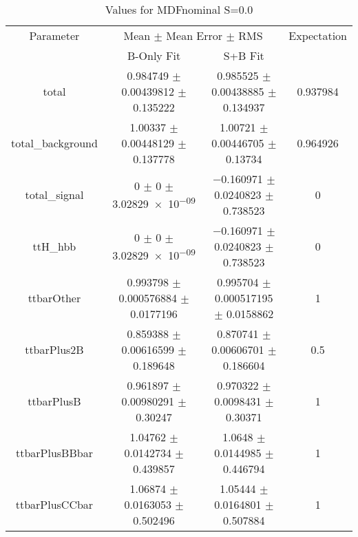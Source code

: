 \begin{table}
\centering
\caption{Values for MDFnominal S=0.0}
\begin{tabular}{cccc}
\toprule
Parameter & \multicolumn{2}{c}{Mean $\pm$ Mean Error $\pm$ RMS} & Expectation\\
 & B-Only Fit & S+B Fit & \\
\midrule
total & \num{0.984749} $\pm$ \num{0.00439812} $\pm$ \num{0.135222} & \num{0.985525} $\pm$ \num{0.00438885} $\pm$ \num{0.134937} & \num{0.937984}\\
total\_background & \num{1.00337} $\pm$ \num{0.00448129} $\pm$ \num{0.137778} & \num{1.00721} $\pm$ \num{0.00446705} $\pm$ \num{0.13734} & \num{0.964926}\\
total\_signal & \num{0} $\pm$ \num{0} $\pm$ \num{3.02829e-09} & \num{-0.160971} $\pm$ \num{0.0240823} $\pm$ \num{0.738523} & \num{0}\\
ttH\_hbb & \num{0} $\pm$ \num{0} $\pm$ \num{3.02829e-09} & \num{-0.160971} $\pm$ \num{0.0240823} $\pm$ \num{0.738523} & \num{0}\\
ttbarOther & \num{0.993798} $\pm$ \num{0.000576884} $\pm$ \num{0.0177196} & \num{0.995704} $\pm$ \num{0.000517195} $\pm$ \num{0.0158862} & \num{1}\\
ttbarPlus2B & \num{0.859388} $\pm$ \num{0.00616599} $\pm$ \num{0.189648} & \num{0.870741} $\pm$ \num{0.00606701} $\pm$ \num{0.186604} & \num{0.5}\\
ttbarPlusB & \num{0.961897} $\pm$ \num{0.00980291} $\pm$ \num{0.30247} & \num{0.970322} $\pm$ \num{0.0098431} $\pm$ \num{0.30371} & \num{1}\\
ttbarPlusBBbar & \num{1.04762} $\pm$ \num{0.0142734} $\pm$ \num{0.439857} & \num{1.0648} $\pm$ \num{0.0144985} $\pm$ \num{0.446794} & \num{1}\\
ttbarPlusCCbar & \num{1.06874} $\pm$ \num{0.0163053} $\pm$ \num{0.502496} & \num{1.05444} $\pm$ \num{0.0164801} $\pm$ \num{0.507884} & \num{1}\\
\bottomrule
\end{tabular}
\end{table}